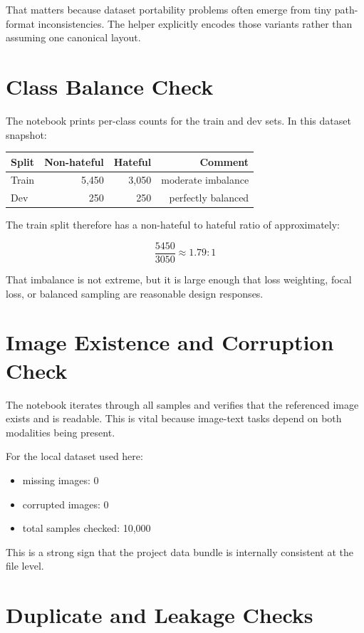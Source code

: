 \documentclass[11pt,a4paper]{report}
\begin{document}
That matters because dataset portability problems often emerge from tiny path-format inconsistencies. The helper explicitly encodes those variants rather than assuming one canonical layout.

\section{Class Balance Check}

The notebook prints per-class counts for the train and dev sets. In this dataset snapshot:

\begin{center}
\begin{tabular}{lrrr}
\toprule
Split & Non-hateful & Hateful & Comment \\
\midrule
Train & 5,450 & 3,050 & moderate imbalance \\
Dev & 250 & 250 & perfectly balanced \\
\bottomrule
\end{tabular}
\end{center}

The train split therefore has a non-hateful to hateful ratio of approximately:

\[
\frac{5450}{3050} \approx 1.79:1
\]

That imbalance is not extreme, but it is large enough that loss weighting, focal loss, or balanced sampling are reasonable design responses.

\section{Image Existence and Corruption Check}

The notebook iterates through all samples and verifies that the referenced image exists and is readable. This is vital because image-text tasks depend on both modalities being present.

For the local dataset used here:

\begin{itemize}
\item missing images: 0
\item corrupted images: 0
\item total samples checked: 10,000
\end{itemize}

This is a strong sign that the project data bundle is internally consistent at the file level.

\section{Duplicate and Leakage Checks}
\end{document}
